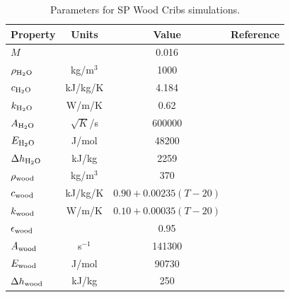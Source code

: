 \begin{table}[p]
\caption[Parameters for SP Wood Cribs simulations]{Parameters for SP Wood Cribs simulations.}
\begin{center}
\begin{tabular}{|l|c|c|l|}
\hline
Property                &      Units    &      Value                         & Reference                      \\ \hline \hline
$M$                     &               & 0.016                              & \cite{Hansen:2010}             \\ \hline
$\rho_{\rm H_2O}$       &     kg/m$^3$  & 1000                               & \cite{Porterie:2000PhysFluids} \\ \hline
$c_{\rm H_2O}$          &    kJ/kg/K    & 4.184                              & \cite{Porterie:2000PhysFluids} \\ \hline
$k_{\rm H_2O}$          &      W/m/K    & 0.62                               & \cite{Porterie:2000PhysFluids} \\ \hline
$A_{\rm H_2O}$          & $\sqrt{K}$/s  & 600000                             & \cite{Porterie:2000PhysFluids} \\ \hline
$E_{\rm H_2O}$          & J/mol         & 48200                              & \cite{Porterie:2000PhysFluids} \\ \hline
$\Delta h_{\rm H_2O}$   & kJ/kg         & 2259                               & \cite{Porterie:2000PhysFluids} \\ \hline \hline
$\rho_{\rm wood}$       &     kg/m$^3$  & 370                                &                                \\ \hline
$c_{\rm wood}$          &    kJ/kg/K    & $0.90+0.00235(T-20)$               &                                \\ \hline
$k_{\rm wood}$          &      W/m/K    & $0.10+0.00035(T-20)$               &                                \\ \hline
$\epsilon_{\rm wood}$   &               & 0.95                               & \cite{Ritchie:1}               \\ \hline
$A_{\rm wood}$          & s$^{-1}$      & 141300                             &                                \\ \hline
$E_{\rm wood}$          & J/mol         & 90730                              &                                \\ \hline
$\Delta h_{\rm wood}$   & kJ/kg         & 250                                &                                \\ \hline \hline

\end{tabular}
\end{center}
\end{table}
